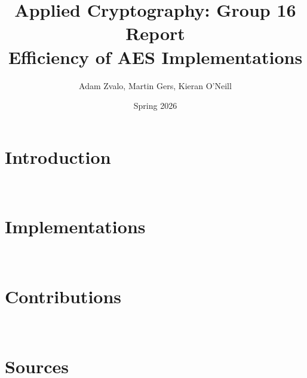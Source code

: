 \documentclass{article}
\title{Applied Cryptography: Group 16 Report \\ [0.2em]\large Efficiency of AES Implementations}
\author{Adam Zvalo, Martin Gers, Kieran O'Neill}
\date{Spring 2026}
\begin{document}
    \maketitle

    \section*{Introduction}
    

    \

    \section*{Implementations}
    

    \

    \section*{Contributions}
    

    \

    \section*{Sources}
    

    \

    \printbibliography
\end{document}
